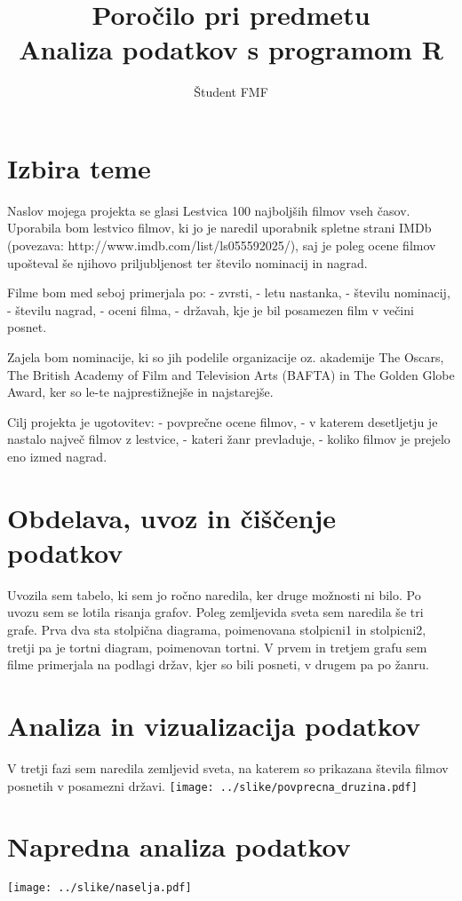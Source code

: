 \documentclass[11pt,a4paper]{article}
\begin{document}
\title{Poročilo pri predmetu \\
Analiza podatkov s programom R}
\author{Študent FMF}
\maketitle

\section{Izbira teme}
Naslov mojega projekta se glasi Lestvica 100 najboljših filmov vseh časov. Uporabila bom lestvico filmov, ki jo je naredil uporabnik spletne strani IMDb (povezava: http://www.imdb.com/list/ls055592025/), saj je poleg ocene filmov upošteval še njihovo priljubljenost ter število nominacij in nagrad.

Filme bom med seboj primerjala po:
- zvrsti,
- letu nastanka,
- številu nominacij,
- številu nagrad,
- oceni filma, 
- državah, kje je bil posamezen film v večini posnet.

Zajela bom nominacije, ki so jih podelile organizacije oz. akademije The Oscars, The British Academy of Film and Television Arts (BAFTA) in The Golden Globe Award, ker so le-te najprestižnejše in najstarejše.  

Cilj projekta je ugotovitev:
- povprečne ocene filmov,
- v katerem desetljetju je nastalo največ filmov z lestvice,
- kateri žanr prevladuje,
- koliko filmov je prejelo eno izmed nagrad. 

\section{Obdelava, uvoz in čiščenje podatkov}
Uvozila sem tabelo, ki sem jo ročno naredila, ker druge možnosti ni bilo. Po uvozu sem se lotila risanja grafov. Poleg zemljevida sveta sem naredila še tri grafe. Prva dva sta stolpična diagrama, poimenovana stolpicni1 in stolpicni2, tretji pa je tortni diagram, poimenovan tortni. V prvem in tretjem grafu sem filme primerjala na podlagi držav, kjer so bili posneti, v drugem pa po žanru.


% 
% 

\section{Analiza in vizualizacija podatkov}

V tretji fazi sem naredila zemljevid sveta, na katerem so prikazana števila filmov posnetih v posamezni državi.
\texttt{[image: ../slike/povprecna\_druzina.pdf]}

\section{Napredna analiza podatkov}

\texttt{[image: ../slike/naselja.pdf]}
\end{document}
